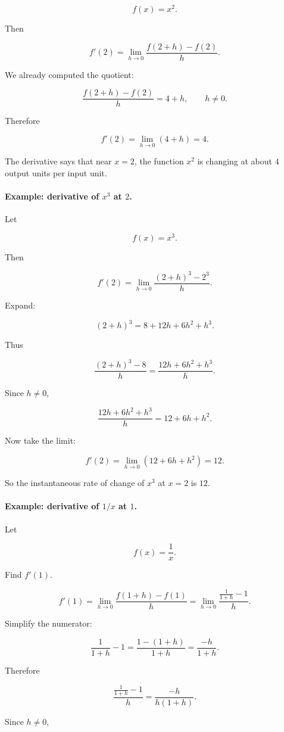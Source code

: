 \[
f(x)=x^2.
\]

Then

\[
f'(2)
=
\lim_{h\to0}\frac{f(2+h)-f(2)}{h}.
\]

We already computed the quotient:

\[
\frac{f(2+h)-f(2)}{h}
=
4+h,
\qquad h\neq0.
\]

Therefore

\[
f'(2)
=
\lim_{h\to0}(4+h)
=
4.
\]

The derivative says that near \(x=2\), the function \(x^2\) is changing at about \(4\) output units per input unit.

\paragraph{Example: derivative of \(x^3\) at \(2\).}
Let

\[
f(x)=x^3.
\]

Then

\[
f'(2)
=
\lim_{h\to0}\frac{(2+h)^3-2^3}{h}.
\]

Expand:

\[
(2+h)^3
=
8+12h+6h^2+h^3.
\]

Thus

\[
\frac{(2+h)^3-8}{h}
=
\frac{12h+6h^2+h^3}{h}.
\]

Since \(h\neq0\),

\[
\frac{12h+6h^2+h^3}{h}
=
12+6h+h^2.
\]

Now take the limit:

\[
f'(2)
=
\lim_{h\to0}(12+6h+h^2)
=
12.
\]

So the instantaneous rate of change of \(x^3\) at \(x=2\) is \(12\).

\paragraph{Example: derivative of \(1/x\) at \(1\).}
Let

\[
f(x)=\frac1x.
\]

Find \(f'(1)\).

\[
f'(1)
=
\lim_{h\to0}\frac{f(1+h)-f(1)}{h}
=
\lim_{h\to0}\frac{\frac{1}{1+h}-1}{h}.
\]

Simplify the numerator:

\[
\frac{1}{1+h}-1
=
\frac{1-(1+h)}{1+h}
=
\frac{-h}{1+h}.
\]

Therefore

\[
\frac{\frac{1}{1+h}-1}{h}
=
\frac{-h}{h(1+h)}.
\]

Since \(h\neq0\),


